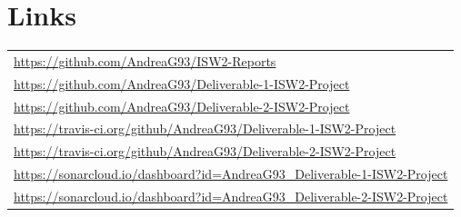 \documentclass[sigconf]{acmart}
\begin{document}
\clearpage

\section{Links}

\begin{table}[!ht]
\small
\begin{tabular}{l}

\url{https://github.com/AndreaG93/ISW2-Reports} \\

\url{https://github.com/AndreaG93/Deliverable-1-ISW2-Project} \\

\url{https://github.com/AndreaG93/Deliverable-2-ISW2-Project} \\

\url{https://travis-ci.org/github/AndreaG93/Deliverable-1-ISW2-Project} \\

\url{https://travis-ci.org/github/AndreaG93/Deliverable-2-ISW2-Project} \\

\url{https://sonarcloud.io/dashboard?id=AndreaG93_Deliverable-1-ISW2-Project} \\

\url{https://sonarcloud.io/dashboard?id=AndreaG93_Deliverable-2-ISW2-Project} \\

\end{tabular}
\end{table}



\end{document}

